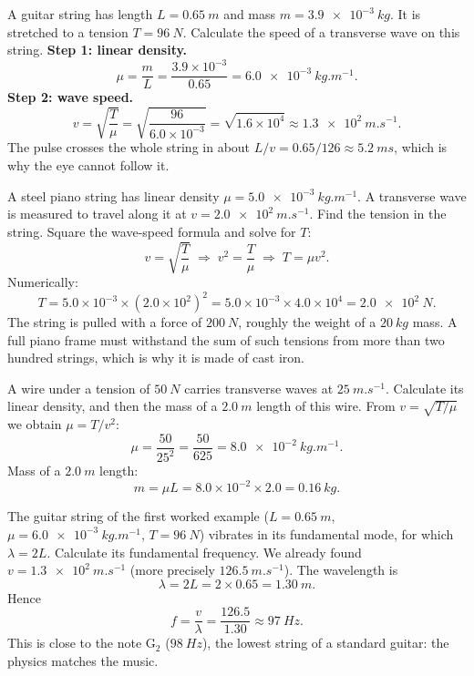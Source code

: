 \documentclass[11pt]{article}
\newcounter{popsec}
\newcounter{popsub}
\newcommand{\courssub}[1]{%
  \stepcounter{popsub}%
  \par\vspace{9pt}\noindent{\popxbold\fontsize{11.5}{13}\selectfont\color{popink}{\color{poporange}\thepopsec.\thepopsub}\hspace{6pt}#1}\par\nopagebreak\vspace{4pt}
}
\begin{document}
\courssub{Worked Examples}

\begin{exoresolu}
A guitar string has length $L = \SI{0.65}{m}$ and mass $m = \SI{3.9e-3}{kg}$. It is stretched to a tension $T = \SI{96}{N}$. Calculate the speed of a transverse wave on this string.
\tcblower
\textbf{Step 1: linear density.}
\[
\mu = \frac{m}{L} = \frac{3.9\times 10^{-3}}{0.65} = \SI{6.0e-3}{kg.m^{-1}}.
\]
\textbf{Step 2: wave speed.}
\[
v = \sqrt{\frac{T}{\mu}} = \sqrt{\frac{96}{6.0\times 10^{-3}}}
= \sqrt{1.6\times 10^{4}} \approx \SI{1.3e2}{m.s^{-1}}.
\]
The pulse crosses the whole string in about $L/v = 0.65/126 \approx \SI{5.2}{ms}$, which is why the eye cannot follow it.
\end{exoresolu}

\begin{exoresolu}
A steel piano string has linear density $\mu = \SI{5.0e-3}{kg.m^{-1}}$. A transverse wave is measured to travel along it at $v = \SI{2.0e2}{m.s^{-1}}$. Find the tension in the string.
\tcblower
Square the wave-speed formula and solve for $T$:
\[
v = \sqrt{\frac{T}{\mu}} \;\Rightarrow\; v^{2} = \frac{T}{\mu} \;\Rightarrow\; T = \mu v^{2}.
\]
Numerically:
\[
T = 5.0\times 10^{-3}\times(2.0\times 10^{2})^{2}
= 5.0\times 10^{-3}\times 4.0\times 10^{4}
= \SI{2.0e2}{N}.
\]
The string is pulled with a force of $\SI{200}{N}$, roughly the weight of a $\SI{20}{kg}$ mass. A full piano frame must withstand the sum of such tensions from more than two hundred strings, which is why it is made of cast iron.
\end{exoresolu}

\begin{exoresolu}
A wire under a tension of $\SI{50}{N}$ carries transverse waves at $\SI{25}{m.s^{-1}}$. Calculate its linear density, and then the mass of a $\SI{2.0}{m}$ length of this wire.
\tcblower
From $v = \sqrt{T/\mu}$ we obtain $\mu = T/v^{2}$:
\[
\mu = \frac{50}{25^{2}} = \frac{50}{625} = \SI{8.0e-2}{kg.m^{-1}}.
\]
Mass of a $\SI{2.0}{m}$ length:
\[
m = \mu L = 8.0\times 10^{-2}\times 2.0 = \SI{0.16}{kg}.
\]
\end{exoresolu}

\begin{exoresolu}
The guitar string of the first worked example ($L = \SI{0.65}{m}$, $\mu = \SI{6.0e-3}{kg.m^{-1}}$, $T = \SI{96}{N}$) vibrates in its fundamental mode, for which $\lambda = 2L$. Calculate its fundamental frequency.
\tcblower
We already found $v = \SI{1.3e2}{m.s^{-1}}$ (more precisely $\SI{126.5}{m.s^{-1}}$). The wavelength is
\[
\lambda = 2L = 2\times 0.65 = \SI{1.30}{m}.
\]
Hence
\[
f = \frac{v}{\lambda} = \frac{126.5}{1.30} \approx \SI{97}{Hz}.
\]
This is close to the note G$_2$ ($\SI{98}{Hz}$), the lowest string of a standard guitar: the physics matches the music.
\end{exoresolu}
\end{document}
